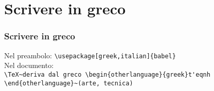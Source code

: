 \section{Scrivere in greco}
\begin{frame}[fragile]\transfade\centering
  \frametitle{Scrivere in greco}
  Nel preambolo: \verb!\usepackage[greek,italian]{babel}!\\
  Nel documento: \\
  \verb!\TeX~deriva dal greco \begin{otherlanguage}{greek}t'eqnh!\\
  \verb!\end{otherlanguage}~(arte, tecnica)!\\
  \\~
\end{frame}

